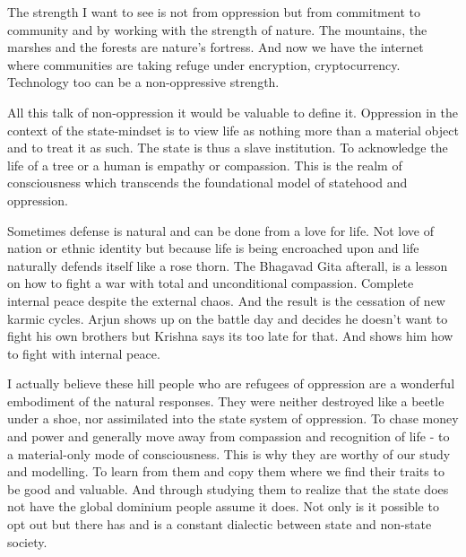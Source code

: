 The strength I want to see is not from oppression but from commitment to community and by working with the strength of nature. The mountains, the marshes and the forests are nature's fortress. And now we have the internet where communities are taking refuge under encryption, cryptocurrency. Technology too can be a non-oppressive strength.

All this talk of non-oppression it would be valuable to define it. Oppression in the context of the state-mindset is to view life as nothing more than a material object and to treat it as such. The state is thus a slave institution. To acknowledge the life of a tree or a human is empathy or compassion. This is the realm of consciousness which transcends the foundational model of statehood and oppression.

Sometimes defense is natural and can be done from a love for life. Not love of nation or ethnic identity but because life is being encroached upon and life naturally defends itself like a rose thorn. The Bhagavad Gita afterall, is a lesson on how to fight a war with total and unconditional compassion. Complete internal peace despite the external chaos. And the result is the cessation of new karmic cycles. Arjun shows up on the battle day and decides he doesn't want to fight his own brothers but Krishna says its too late for that. And shows him how to fight with internal peace.

I actually believe these hill people who are refugees of oppression are a wonderful embodiment of the natural responses. They were neither destroyed like a beetle under a shoe, nor assimilated into the state system of oppression. To chase money and power and generally move away from compassion and recognition of life - to a material-only mode of consciousness. This is why they are worthy of our study and modelling. To learn from them and copy them where we find their traits to be good and valuable. And through studying them to realize that the state does not have the global dominium people assume it does. Not only is it possible to opt out but there has and is a constant dialectic between state and non-state society.
